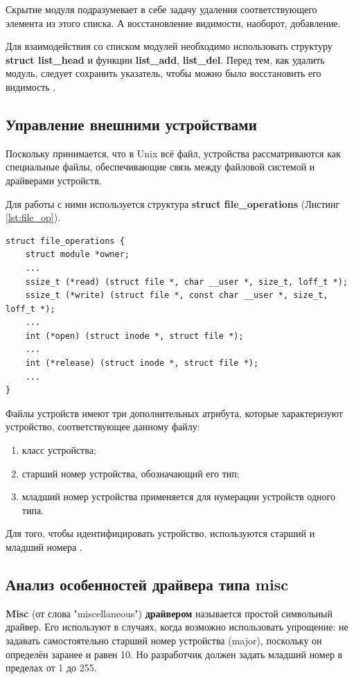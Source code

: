Скрытие модуля подразумевает в себе задачу удаления соответствующего элемента из этого списка. А восстановление видимости, наоборот, добавление.

Для взаимодействия со списком модулей необходимо использовать структуру \textbf{struct list\_head} и функции \textbf{list\_add}, \textbf{list\_del}. Перед тем, как удалить модуль, следует сохранить указатель, чтобы можно было восстановить его видимость \cite{hide}.  \newline

\subsection{Управление внешними устройствами}
Поскольку принимается, что в Unix всё файл, устройства рассматриваются как специальные файлы, обеспечивающие связь между файловой системой и драйверами устройств. 

Для работы с ними используется структура \textbf{struct file\_operations} (Листинг \ref{lst:file_op}). 
\begin{lstlisting}[caption = {struct file\_operations}, label=lst:file_op]
struct file_operations {
	struct module *owner;
	...
	ssize_t (*read) (struct file *, char __user *, size_t, loff_t *);
	ssize_t (*write) (struct file *, const char __user *, size_t, loff_t *);
	...
	int (*open) (struct inode *, struct file *);
	...
	int (*release) (struct inode *, struct file *);
	...
}
\end{lstlisting}

Файлы устройств имеют три дополнительных атрибута, которые характеризуют устройство, соответствующее данному файлу:
\begin{enumerate}
	\item класс устройства;

	\item старший номер устройства, обозначающий его тип;
	
	\item младший номер устройства применяется для нумерации устройств одного типа.
\end{enumerate}

Для того, чтобы идентифицировать устройство, используются старший и младший номера \cite{os}.  \newline

\subsection{Анализ особенностей драйвера типа misc}
\textbf{Misc} (от слова "miscellaneous") \textbf{драйвером} называется простой символьный драйвер. Его используют в случаях, когда возможно использовать упрощение: не задавать самостоятельно старший номер устройства (major), поскольку он определён заранее и равен 10. Но разработчик должен задать младший номер в пределах от 1 до 255. \cite{2nd,misc}

